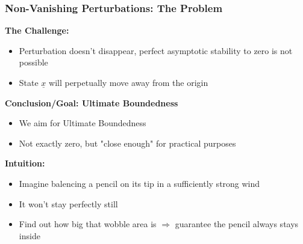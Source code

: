\documentclass[student, noshadow, lsr, english, aspectratio=169, t]{ITR_LSR_slides}
\begin{document}
\begin{frame}
    \frametitle{Non-Vanishing Perturbations: The Problem}
	\textbf{The Challenge:}
    \begin{itemize}
        \item Perturbation doesn't disappear, perfect asymptotic stability to zero is not possible
        \item State $\underline{x}$ will perpetually move away from the origin
    \end{itemize}

    \vspace{0.3cm}
    \textbf{Conclusion/Goal: Ultimate Boundedness}
    \begin{itemize}
        \item We aim for Ultimate Boundedness
        \item Not exactly zero, but "close enough" for practical purposes
    \end{itemize}

	\vspace{0.3cm}
    \textbf{Intuition:}
    \begin{itemize}
        \item Imagine balencing a pencil on its tip in a sufficiently strong wind
        \item It won't stay perfectly still
        \item Find out how big that wobble area is $\Rightarrow$ guarantee the pencil always stays inside
    \end{itemize}
\end{frame}
\end{document}
